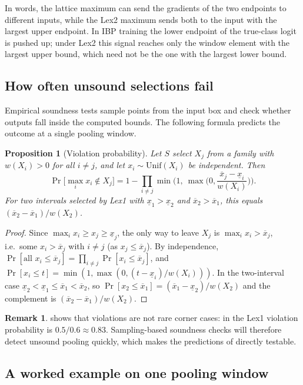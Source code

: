 \documentclass[preprint,12pt]{elsarticle}
\newtheorem{proposition}[theorem]{Proposition}
\theoremstyle{definition}
\newtheorem{remark}[theorem]{Remark}
\newcommand{\lo}[1]{\underline{#1}}
\newcommand{\up}[1]{\overline{#1}}
\begin{document}
In words, the lattice maximum can send the gradients of the two endpoints to different inputs, while the Lex2 maximum sends both to the input with the largest upper endpoint. In IBP training the lower endpoint of the true-class logit is pushed up; under Lex2 this signal reaches only the window element with the largest upper bound, which need not be the one with the largest lower bound.

\subsection{How often unsound selections fail}

Empirical soundness tests sample points from the input box and check whether outputs fall inside the computed bounds. The following formula predicts the outcome at a single pooling window.

\begin{proposition}[Violation probability]\label{prop:violation}
Let $S$ select $X_j$ from a family with $w(X_i)>0$ for all $i\ne j$, and let $x_i\sim\mathrm{Unif}(X_i)$ be independent. Then
\[
\Pr\big[\max_ix_i\notin X_j\big]=1-\prod_{i\ne j}\min\Big(1,\ \max\Big(0,\frac{\up x_j-\lo x_i}{w(X_i)}\Big)\Big).
\]
For two intervals selected by Lex1 with $\lo x_1>\lo x_2$ and $\up x_2>\up x_1$, this equals $(\up x_2-\up x_1)/w(X_2)$.
\end{proposition}

\begin{proof}
Since $\max_ix_i\ge x_j\ge\lo x_j$, the only way to leave $X_j$ is $\max_ix_i>\up x_j$, i.e.\ some $x_i>\up x_j$ with $i\ne j$ (as $x_j\le\up x_j$). By independence, $\Pr[\text{all }x_i\le\up x_j]=\prod_{i\ne j}\Pr[x_i\le\up x_j]$, and $\Pr[x_i\le t]=\min(1,\max(0,(t-\lo x_i)/w(X_i)))$. In the two-interval case $\lo x_2<\lo x_1\le\up x_1<\up x_2$, so $\Pr[x_2\le\up x_1]=(\up x_1-\lo x_2)/w(X_2)$ and the complement is $(\up x_2-\up x_1)/w(X_2)$.
\end{proof}

\begin{remark}
 shows that violations are not rare corner cases: in  the Lex1 violation probability is $0.5/0.6\approx0.83$. Sampling-based soundness checks will therefore detect unsound pooling quickly, which makes the predictions of  directly testable.
\end{remark}

\subsection{A worked example on one pooling window}
\end{document}
